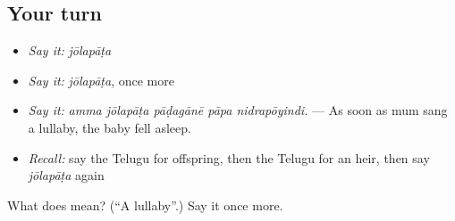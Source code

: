 \subsection*{Your turn}
\begin{itemize}
\raggedright
  \item \emph{Say it:} \emph{jōlapāṭa}
  \item \emph{Say it:} \emph{jōlapāṭa}, once more
  \item \emph{Say it:} \emph{amma jōlapāṭa pāḍagānē pāpa nidrapōyindi.} — As soon as mum sang a lullaby, the baby fell asleep.
  \item \emph{Recall:} say the Telugu for offspring, then the Telugu for an heir, then say \emph{jōlapāṭa} again
\end{itemize}

\begin{tcolorbox}[breakable,colback=teal!4,colframe=teal!35!black,title={Before you move on}]
What does  mean? (\textquotedblleft{}A lullaby\textquotedblright{}.) Say it once more.
\end{tcolorbox}
